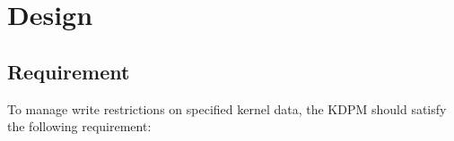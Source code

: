 \section{Design} \label{section:approach}

\subsection{Requirement} \label{subsection:design}

To manage write restrictions on specified kernel data, 
the KDPM should satisfy the following requirement: 


